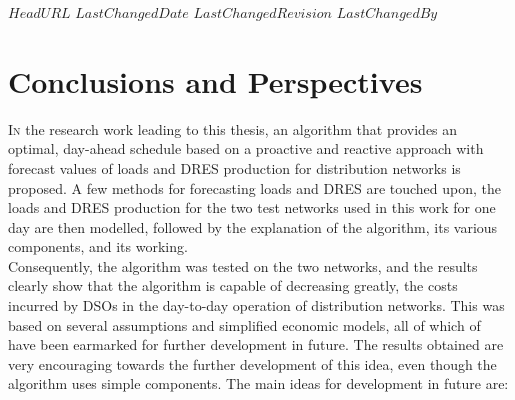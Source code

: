 \svnidlong
{$HeadURL$}
{$LastChangedDate$}
{$LastChangedRevision$}
{$LastChangedBy$}

\chapter{Conclusions and Perspectives}

\lettrine[nindent=0pt]{I}{n} the research work leading to this thesis, an algorithm that provides an optimal, day-ahead schedule based on a proactive and reactive approach with forecast values of loads and DRES production for distribution networks is proposed. A few methods for forecasting loads and DRES are touched upon, the loads and DRES production for the two test networks used in this work for one day are then modelled, followed by the explanation of the algorithm, its various components, and its working.\\

Consequently, the algorithm was tested on the two networks, and the results clearly show that the algorithm is capable of decreasing greatly, the costs incurred by DSOs in the day-to-day operation of distribution networks. This was based on several assumptions and simplified economic models, all of which of have been earmarked for further development in future. The results obtained are very encouraging towards the further development of this idea, even though the algorithm uses simple components. The main ideas for development in future are:\\

